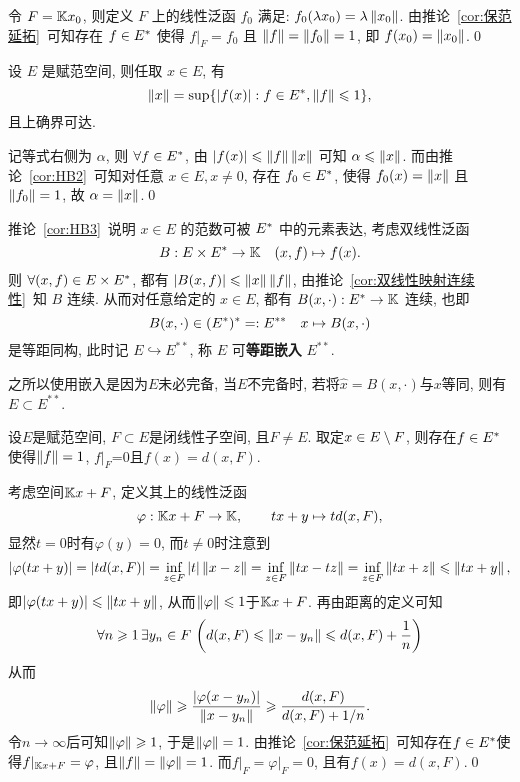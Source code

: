     \begin{Proof}
        令 $ F=\mathbb{K} x_{0} $, 则定义 $ F $ 上的线性泛函 $ f_{0} $ 满足: $ f_{0}(\lambda x_{0})=\lambda\left\| x_{0} \right\| $. 由推论~\ref{cor:保范延拓}~可知存在 $ f\in E^{*} $ 使得 $ f|_{F}=f_{0} $ 且 $ \left\| f \right\|=\left\| f_{0} \right\|=1 $, 即 $ f(x_{0})=\left\| x_{0} \right\| $.\qed
    \end{Proof}
    \begin{Corollary}\label{cor:HB3}
        设 $ E $ 是赋范空间, 则任取 $ x\in E $, 有
        \[
            \left\| x \right\|=\sup\{ \left| f(x) \right| :f\in E^{*}, \left\| f \right\|\leqslant1 \},
        \]
        且上确界可达.
    \end{Corollary}
    \begin{Proof}
        记等式右侧为 $ \alpha $, 则 $ \forall f\in E^{*} $, 由 $ \left| f(x) \right| \leqslant\left\| f \right\|\left\| x \right\| $ 可知 $ \alpha \leqslant\left\| x \right\| $. 而由推论~\ref{cor:HB2}~可知对任意 $ x\in E, x\ne 0 $, 存在 $ f_{0}\in E^{*} $, 使得 $ f_{0}(x)=\left\| x \right\| $ 且 $ \left\| f_{0} \right\|=1 $, 故 $ \alpha =\left\| x \right\| $.\qed
    \end{Proof}
    推论~\ref{cor:HB3}~说明 $ x\in E $ 的范数可被 $ E^{*} $ 中的元素表达, 考虑双线性泛函
    \[
        B:E\times E^{*}\to\mathbb{K}\quad(x, f)\mapsto f(x).
    \]
    则 $ \forall(x, f)\in E\times E^{*} $, 都有 $ \left| B(x, f) \right| \leqslant\left\| x \right\|\left\| f \right\| $, 由推论~\ref{cor:双线性映射连续性}~知 $ B $ 连续. 从而对任意给定的 $ x\in E $, 都有 $ B(x, \cdot):E^{*}\to\mathbb{K} $ 连续, 也即
    \[
        B(x,\cdot)\in(E^{*})^{*}=: E^{**}\quad x\mapsto B(x, \cdot)
    \]
    是等距同构, 此时记 $ E\hookrightarrow E^{**} $, 称 $ E $ 可\textbf{等距嵌入} $ E^{**} $.
    
    之所以使用嵌入是因为$ E $未必完备, 当$ E $不完备时, 若将$ \hat{x}=B(x,\cdot) $与$ x $等同, 则有$ E\subset E^{**} $.
    
    \begin{Corollary}\label{cor:HB4}
    设$ E $是赋范空间, $ F\subset E $是闭线性子空间, 且$ F\ne E $. 取定$ x\in E\setminus F $, 则存在$ f\in E^{*} $使得$ \left\| f \right\|=1 $, $ f\rvert_F $=0且$ f(x)=d(x,F) $.
    \end{Corollary}
    \begin{Proof}
    考虑空间$ \mathbb{K} x+F $, 定义其上的线性泛函
    \[
    \varphi : \mathbb{K} x+F\to\mathbb{K},\qquad tx+y\mapsto td(x,F),
    \]
    显然$ t=0 $时有$ \varphi(y)=0 $, 而$ t\ne 0 $时注意到
    \[
    \left| \varphi(tx+y) \right| =\left| td(x,F) \right| =\inf_{z\in F}\left| t \right| \left\| x-z \right\|=\inf_{z\in F}\left\| tx-tz \right\|=\inf_{z\in F}\left\| tx+z \right\|\leqslant\left\| tx+y \right\|,
    \]
    即$ \left| \varphi(tx+y) \right| \leqslant\left\| tx+y \right\| $, 从而$ \left\| \varphi \right\|\leqslant 1 $于$ \mathbb{K} x+F $. 再由距离的定义可知
    \[
    \forall n\geqslant 1\,\exists y_n\in F\,\left(d(x,F)\leqslant\left\| x-y_n \right\|\leqslant d(x,F)+\frac{1}{n}\right)
    \]
    从而
    \[
    \left\| \varphi \right\|\geqslant\frac{\left| \varphi(x-y_n) \right| }{\left\| x-y_n \right\|}\geqslant\frac{d(x,F)}{d(x,F)+1/n}.
    \]
    令$ n\to\infty $后可知$ \left\| \varphi \right\|\geqslant 1 $, 于是$ \left\| \varphi \right\|=1 $. 由推论~\ref{cor:保范延拓}~可知存在$ f\in E^{*} $使得$ f\rvert_{\mathbb{K} x+F}=\varphi $, 且$ \left\| f \right\|=\left\| \varphi \right\|=1 $. 而$ f\rvert_F=\varphi\rvert_F=0 $, 且有$ f(x)=d(x,F) $.\qed
    \end{Proof}
    
